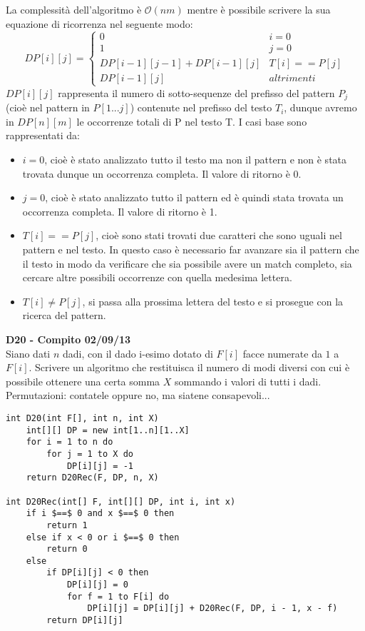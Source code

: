 \documentclass[../cheatSheetAlgoritmi.tex]{subfiles}
\begin{document}
La complessità dell'algoritmo è $\mathcal{O}(nm)$ mentre è possibile scrivere la sua equazione di ricorrenza nel seguente modo:
\begin{equation*}
  	DP[i][j] =\begin{cases}
    	0 & \text{$i = 0$}\\
    	1 & \text{$j = 0$}\\
    	DP[i-1][j-1] + DP[i-1][j] & \text{$T[i] == P[j]$}\\
    	DP[i-1][j] & \text{$altrimenti$}
  	\end{cases}
\end{equation*}
$DP[i][j]$ rappresenta il numero di sotto-sequenze del prefisso del pattern $P_{j}$ (cioè nel pattern in $P[1...j]$) contenute nel prefisso del testo $T_{i}$, dunque avremo in $DP[n][m]$ le occorrenze totali di P nel testo T. I casi base sono rappresentati da:
\begin{itemize}
	\item $i = 0$, cioè è stato analizzato tutto il testo ma non il pattern e non è stata trovata dunque un occorrenza completa. Il valore di ritorno è 0.
	\item $j = 0$, cioè è stato analizzato tutto il pattern ed è quindi stata trovata un occorrenza completa. Il valore di ritorno è 1.
	\item $T[i] == P[j]$, cioè sono stati trovati due caratteri che sono uguali nel pattern e nel testo. In questo caso è necessario far avanzare sia il pattern che il testo in modo da verificare che sia possibile avere un match completo, sia cercare altre possibili occorrenze con quella medesima lettera.
	\item $T[i] \neq P[j]$, si passa alla prossima lettera del testo e si prosegue con la ricerca del pattern.
\end{itemize}
\textbf{D20 - Compito 02/09/13}\\
Siano dati $n$ dadi, con il dado i-esimo dotato di $F[i]$ facce numerate da $1$ a $F[i]$. Scrivere un algoritmo che restituisca il numero di modi diversi con cui è possibile ottenere una certa somma $X$ sommando i valori di tutti i dadi. Permutazioni: contatele oppure no, ma siatene consapevoli...
\begin{lstlisting}[caption= D20 con permutazioni]
int D20(int F[], int n, int X)
    int[][] DP = new int[1..n][1..X]
    for i = 1 to n do
        for j = 1 to X do
            DP[i][j] = -1
    return D20Rec(F, DP, n, X)

int D20Rec(int[] F, int[][] DP, int i, int x)
    if i $==$ 0 and x $==$ 0 then
        return 1
    else if x < 0 or i $==$ 0 then
        return 0
    else
        if DP[i][j] < 0 then
            DP[i][j] = 0
            for f = 1 to F[i] do
                DP[i][j] = DP[i][j] + D20Rec(F, DP, i - 1, x - f)
        return DP[i][j]
\end{lstlisting}
\end{document}
